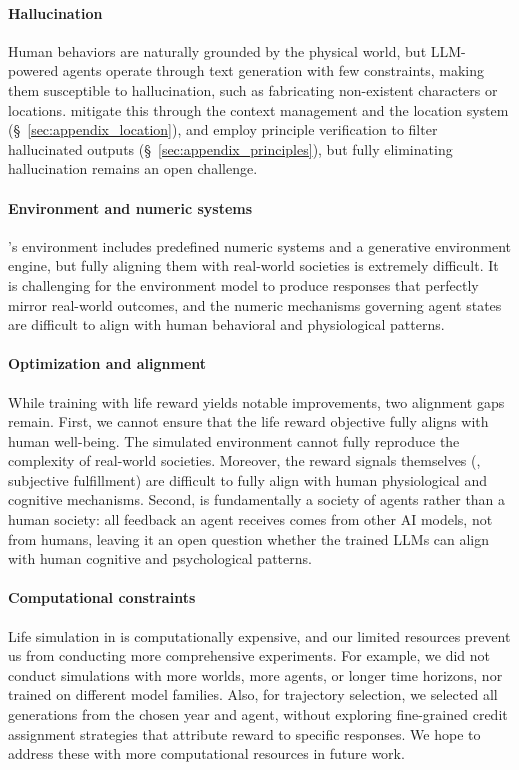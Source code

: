 \paragraph{Hallucination}
Human behaviors are naturally grounded by the physical world, but LLM-powered agents operate through text generation with few constraints, making them susceptible to hallucination, such as fabricating non-existent characters or locations.
\method mitigate this through the context management and the location system (\S~\ref{sec:appendix_location}), and employ principle verification to filter hallucinated outputs (\S~\ref{sec:appendix_principles}), but fully eliminating hallucination remains an open challenge.

\paragraph{Environment and numeric systems}
\method's environment includes predefined numeric systems and a generative environment engine, but fully aligning them with real-world societies is extremely difficult.
It is challenging for the environment model to produce responses that perfectly mirror real-world outcomes, and the numeric mechanisms governing agent states are difficult to align with human behavioral and physiological patterns.

\paragraph{Optimization and alignment}
While training with life reward yields notable improvements, two alignment gaps remain.
First, we cannot ensure that the life reward objective fully aligns with human well-being.
The simulated environment cannot fully reproduce the complexity of real-world societies.
Moreover, the reward signals themselves (\eg, subjective fulfillment) are difficult to fully align with human physiological and cognitive mechanisms.
Second, \method is fundamentally a society of agents rather than a human society: all feedback an agent receives comes from other AI models, not from humans, leaving it an open question whether the trained LLMs can align with human cognitive and psychological patterns.

\paragraph{Computational constraints}
Life simulation in \method is computationally expensive, and our limited resources prevent us from conducting more comprehensive experiments.
For example, we did not conduct simulations with more worlds, more agents, or longer time horizons, nor trained on different model families.
Also, for trajectory selection, we selected all generations from the chosen year and agent, without exploring fine-grained credit assignment strategies that attribute reward to specific responses.
We hope to address these with more computational resources in future work.

